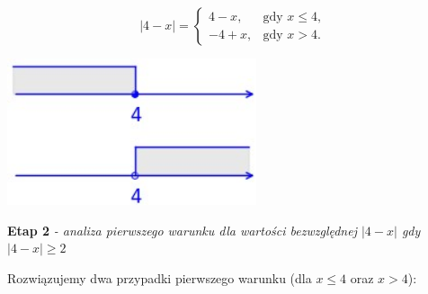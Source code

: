 \documentclass[12pt, a4paper]{report}
\begin{document}
    \begin{center}                           %
    \begin{minipage}[c]{0.3\textwidth}       %
    \vspace*{\fill}                          %
    \[
        |4-x| = \begin{cases}
                    4-x, & \text{gdy } x \leq 4, \\
                    -4+x, & \text{gdy } x > 4.
        \end{cases}
    \]
    \vspace*{\fill}                          %
    \end{minipage}
    \hspace{0.05cm}                          %
    \begin{minipage}[c]{0.4\textwidth}       %
        \centering
        \hspace{0.3cm}                       %
        \includegraphics[width=0.55\textwidth]{fig_1.jpg}   %
        \vspace*{\fill}                      %
    \end{minipage}
    \end{center}

    \vspace{20pt}                            %

    \noindent
    \textbf{Etap 2}
    \emph{ - analiza pierwszego warunku dla wartości bezwzględnej $|4-x|$ gdy $|4 - x| \geq 2$}

    \noindent
    Rozwiązujemy dwa przypadki pierwszego warunku (dla $x \leq 4$ oraz $x > 4$):
\end{document}
